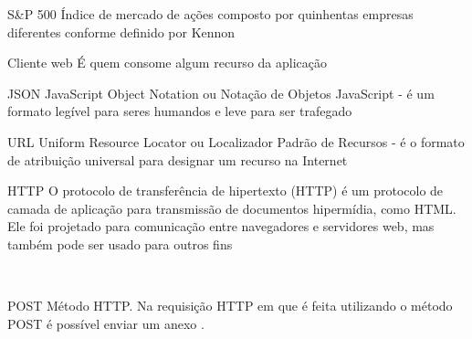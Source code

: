 \begin{siglas}
    \item[S\&P 500] Índice de mercado de ações composto por
                    quinhentas empresas diferentes conforme definido
                    por Kennon \cite{definicao-de-sp500}

    \item[Cliente web] É quem consome algum recurso da aplicação

    \item[JSON] JavaScript Object Notation ou Notação de Objetos JavaScript -
                é um formato legível para seres humandos e leve para ser trafegado \cite{define-json}

    \item[URL] Uniform Resource Locator ou Localizador Padrão de Recursos - é o formato de atribuição
               universal para designar um recurso na Internet \cite{define-url}
               
    \item[HTTP] O protocolo de transferência de hipertexto (HTTP) é um protocolo de camada de aplicação
               para transmissão de documentos hipermídia, como HTML. Ele foi projetado para comunicação
               entre navegadores e servidores web, mas também pode ser usado para outros fins \cite{define-http}
               
    \item[POST] Método HTTP. Na requisição HTTP em que é feita utilizando o método POST é possível enviar um anexo \cite{define-post}.
\end{siglas}
